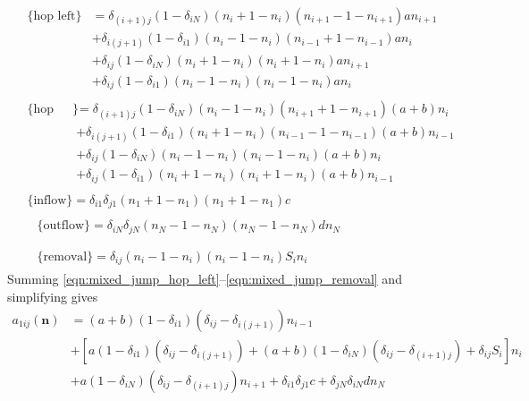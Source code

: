 \documentclass[a4paper,11pt]{report}
\numberwithin{equation}{section}
\newcommand{\V}[1]{\mathbf{#1}}
\begin{document}
\begin{align}
    &\begin{aligned}
        \{\text{hop left}\}
        &= \delta_{(i+1)j}(1 - \delta_{iN})(n_i + 1 - n_i)(n_{i+1} - 1 -
        n_{i+1})a n_{i+1}\\
        &+ \delta_{i(j+1)}(1 - \delta_{i1})(n_i - 1 - n_i)(n_{i-1} + 1 -
        n_{i-1})a n_i\\
        &+ \delta_{ij}(1 - \delta_{iN})(n_i + 1 - n_i)(n_i + 1 - n_i)a n_{i+1}\\
        &+ \delta_{ij}(1 - \delta_{i1})(n_i - 1 - n_i)(n_i - 1 - n_i)a n_i
        \label{eqn:mixed_jump_hop_left}
    \end{aligned}\\
    &\begin{aligned}
        \{\text{hop right}\}
        &= \delta_{(i+1)j}(1 - \delta_{iN})(n_i - 1 - n_i)(n_{i+1} + 1 -
        n_{i+1})(a+b) n_i\\
        &+ \delta_{i(j+1)}(1 - \delta_{i1})(n_i + 1 - n_i)(n_{i-1} - 1 -
        n_{i-1})(a+b) n_{i-1}\\
        &+ \delta_{ij}(1 - \delta_{iN})(n_i - 1 - n_i)(n_i - 1 - n_i)(a+b) n_i\\
        &+ \delta_{ij}(1 - \delta_{i1})(n_i + 1 - n_i)(n_i + 1 - n_i)(a+b)
        n_{i-1}
        \label{eqn:mixed_jump_hop_right}
    \end{aligned}\\
    &\begin{aligned}
        \{\text{inflow}\} = \delta_{i1}\delta_{j1} (n_1 + 1 - n_1)(n_1 + 1 -
        n_1)c
        \label{eqn:mixed_jump_inflow}
    \end{aligned}\\
    &\begin{aligned}
        &\{\text{outflow}\} = \delta_{iN}\delta_{jN} (n_N - 1 - n_N)(n_N - 1 - n_N)d
        n_N\\
        \label{eqn:mixed_jump_outflow}
    \end{aligned}\\
    &\begin{aligned}
        &\{\text{removal}\} = \delta_{ij}(n_i - 1 - n_i)(n_i - 1 - n_i)S_i n_i
        \label{eqn:mixed_jump_removal}
    \end{aligned}
\end{align}
Summing \eqref{eqn:mixed_jump_hop_left}--\eqref{eqn:mixed_jump_removal} and
simplifying gives
\begin{equation}
    \begin{aligned}
        a_{1ij}(\V{n}) &= (a+b)(1-\delta_{i1})(\delta_{ij} -
        \delta_{i(j+1)})n_{i-1}\\
        &+ \left[ a(1-\delta_{i1})(\delta_{ij} -
        \delta_{i(j+1)}) + (a+b)(1-\delta_{iN})(\delta_{ij}-\delta_{(i+1)j}) +
    \delta_{ij}S_i \right]n_i\\
    &+ a(1-\delta_{iN})(\delta_{ij} - \delta_{(i+1)j})n_{i+1} +
    \delta_{i1}\delta_{j1}c + \delta_{jN}\delta_{iN}d n_N
    \end{aligned}
\end{equation}
\end{document}
